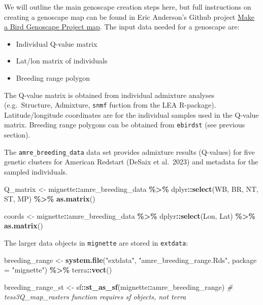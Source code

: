\documentclass[
]{book}
\newenvironment{Shaded}{\begin{snugshade}}{\end{snugshade}}
\newcommand{\AttributeTok}[1]{\textcolor[rgb]{0.13,0.29,0.53}{#1}}
\newcommand{\CommentTok}[1]{\textcolor[rgb]{0.56,0.35,0.01}{\textit{#1}}}
\newcommand{\FunctionTok}[1]{\textcolor[rgb]{0.13,0.29,0.53}{\textbf{#1}}}
\newcommand{\NormalTok}[1]{#1}
\newcommand{\OtherTok}[1]{\textcolor[rgb]{0.56,0.35,0.01}{#1}}
\newcommand{\SpecialCharTok}[1]{\textcolor[rgb]{0.81,0.36,0.00}{\textbf{#1}}}
\newcommand{\StringTok}[1]{\textcolor[rgb]{0.31,0.60,0.02}{#1}}
\providecommand{\tightlist}{%
  \setlength{\itemsep}{0pt}\setlength{\parskip}{0pt}}
\begin{document}
We will outline the main genoscape creation steps here, but full instructions on creating a genoscape map can be found in Eric Anderson's Github project \href{https://github.com/eriqande/make-a-BGP-map}{Make a Bird Genoscape Project map}. The input data needed for a genoscape are:

\begin{itemize}
\tightlist
\item
  Individual Q-value matrix
\item
  Lat/lon matrix of individuals
\item
  Breeding range polygon
\end{itemize}

The Q-value matrix is obtained from individual admixture analyses (e.g.~Structure, Admixture, \texttt{snmf} fuction from the LEA R-package). Latitude/longitude coordinates are for the individual samples used in the Q-value matrix. Breeding range polygons can be obtained from \texttt{ebirdst} (see previous section).

The \texttt{amre\_breeding\_data} data set provides admixture results (Q-values) for five genetic clusters for American Redstart (DeSaix et al.~2023) and metadata for the sampled individuals.

\begin{Shaded}
\begin{Highlighting}[]
\NormalTok{Q\_matrix }\OtherTok{\textless{}{-}}\NormalTok{ mignette}\SpecialCharTok{::}\NormalTok{amre\_breeding\_data }\SpecialCharTok{\%\textgreater{}\%}
\NormalTok{  dplyr}\SpecialCharTok{::}\FunctionTok{select}\NormalTok{(WB, BR, NT, ST, MP) }\SpecialCharTok{\%\textgreater{}\%}
  \FunctionTok{as.matrix}\NormalTok{()}

\NormalTok{coords }\OtherTok{\textless{}{-}}\NormalTok{ mignette}\SpecialCharTok{::}\NormalTok{amre\_breeding\_data }\SpecialCharTok{\%\textgreater{}\%}
\NormalTok{  dplyr}\SpecialCharTok{::}\FunctionTok{select}\NormalTok{(Lon, Lat) }\SpecialCharTok{\%\textgreater{}\%}
  \FunctionTok{as.matrix}\NormalTok{()}
\end{Highlighting}
\end{Shaded}

The larger data objects in \texttt{mignette} are stored in \texttt{extdata}:

\begin{Shaded}
\begin{Highlighting}[]
\NormalTok{breeding\_range }\OtherTok{\textless{}{-}} \FunctionTok{system.file}\NormalTok{(}\StringTok{"extdata"}\NormalTok{, }\StringTok{"amre\_breeding\_range.Rds"}\NormalTok{, }\AttributeTok{package =} \StringTok{"mignette"}\NormalTok{) }\SpecialCharTok{\%\textgreater{}\%}
\NormalTok{  terra}\SpecialCharTok{::}\FunctionTok{vect}\NormalTok{()}
  
\NormalTok{breeding\_range\_st }\OtherTok{\textless{}{-}}\NormalTok{ sf}\SpecialCharTok{::}\FunctionTok{st\_as\_sf}\NormalTok{(mignette}\SpecialCharTok{::}\NormalTok{amre\_breeding\_range) }\CommentTok{\# tess3Q\_map\_rasters function requires sf objects, not terra}
\end{Highlighting}
\end{Shaded}
\end{document}
